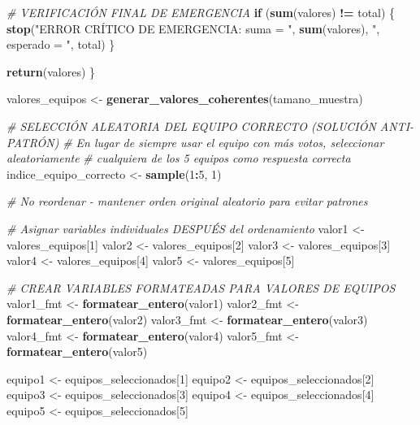 \documentclass[
]{article}
\newenvironment{Shaded}{\begin{snugshade}}{\end{snugshade}}
\newcommand{\CommentTok}[1]{\textcolor[rgb]{0.56,0.35,0.01}{\textit{#1}}}
\newcommand{\ControlFlowTok}[1]{\textcolor[rgb]{0.13,0.29,0.53}{\textbf{#1}}}
\newcommand{\DecValTok}[1]{\textcolor[rgb]{0.00,0.00,0.81}{#1}}
\newcommand{\FunctionTok}[1]{\textcolor[rgb]{0.13,0.29,0.53}{\textbf{#1}}}
\newcommand{\NormalTok}[1]{#1}
\newcommand{\OtherTok}[1]{\textcolor[rgb]{0.56,0.35,0.01}{#1}}
\newcommand{\SpecialCharTok}[1]{\textcolor[rgb]{0.81,0.36,0.00}{\textbf{#1}}}
\newcommand{\StringTok}[1]{\textcolor[rgb]{0.31,0.60,0.02}{#1}}
\begin{document}
\begin{Shaded}
\begin{Highlighting}[]
  \CommentTok{\# VERIFICACIÓN FINAL DE EMERGENCIA}
  \ControlFlowTok{if}\NormalTok{ (}\FunctionTok{sum}\NormalTok{(valores) }\SpecialCharTok{!=}\NormalTok{ total) \{}
    \FunctionTok{stop}\NormalTok{(}\StringTok{"ERROR CRÍTICO DE EMERGENCIA: suma = "}\NormalTok{, }\FunctionTok{sum}\NormalTok{(valores), }\StringTok{", esperado = "}\NormalTok{, total)}
\NormalTok{  \}}

  \FunctionTok{return}\NormalTok{(valores)}
\NormalTok{\}}

\NormalTok{valores\_equipos }\OtherTok{\textless{}{-}} \FunctionTok{generar\_valores\_coherentes}\NormalTok{(tamano\_muestra)}

\CommentTok{\# SELECCIÓN ALEATORIA DEL EQUIPO CORRECTO (SOLUCIÓN ANTI{-}PATRÓN)}
\CommentTok{\# En lugar de siempre usar el equipo con más votos, seleccionar aleatoriamente}
\CommentTok{\# cualquiera de los 5 equipos como respuesta correcta}
\NormalTok{indice\_equipo\_correcto }\OtherTok{\textless{}{-}} \FunctionTok{sample}\NormalTok{(}\DecValTok{1}\SpecialCharTok{:}\DecValTok{5}\NormalTok{, }\DecValTok{1}\NormalTok{)}

\CommentTok{\# No reordenar {-} mantener orden original aleatorio para evitar patrones}

\CommentTok{\# Asignar variables individuales DESPUÉS del ordenamiento}
\NormalTok{valor1 }\OtherTok{\textless{}{-}}\NormalTok{ valores\_equipos[}\DecValTok{1}\NormalTok{]}
\NormalTok{valor2 }\OtherTok{\textless{}{-}}\NormalTok{ valores\_equipos[}\DecValTok{2}\NormalTok{]}
\NormalTok{valor3 }\OtherTok{\textless{}{-}}\NormalTok{ valores\_equipos[}\DecValTok{3}\NormalTok{]}
\NormalTok{valor4 }\OtherTok{\textless{}{-}}\NormalTok{ valores\_equipos[}\DecValTok{4}\NormalTok{]}
\NormalTok{valor5 }\OtherTok{\textless{}{-}}\NormalTok{ valores\_equipos[}\DecValTok{5}\NormalTok{]}

\CommentTok{\# CREAR VARIABLES FORMATEADAS PARA VALORES DE EQUIPOS}
\NormalTok{valor1\_fmt }\OtherTok{\textless{}{-}} \FunctionTok{formatear\_entero}\NormalTok{(valor1)}
\NormalTok{valor2\_fmt }\OtherTok{\textless{}{-}} \FunctionTok{formatear\_entero}\NormalTok{(valor2)}
\NormalTok{valor3\_fmt }\OtherTok{\textless{}{-}} \FunctionTok{formatear\_entero}\NormalTok{(valor3)}
\NormalTok{valor4\_fmt }\OtherTok{\textless{}{-}} \FunctionTok{formatear\_entero}\NormalTok{(valor4)}
\NormalTok{valor5\_fmt }\OtherTok{\textless{}{-}} \FunctionTok{formatear\_entero}\NormalTok{(valor5)}

\NormalTok{equipo1 }\OtherTok{\textless{}{-}}\NormalTok{ equipos\_seleccionados[}\DecValTok{1}\NormalTok{]}
\NormalTok{equipo2 }\OtherTok{\textless{}{-}}\NormalTok{ equipos\_seleccionados[}\DecValTok{2}\NormalTok{]}
\NormalTok{equipo3 }\OtherTok{\textless{}{-}}\NormalTok{ equipos\_seleccionados[}\DecValTok{3}\NormalTok{]}
\NormalTok{equipo4 }\OtherTok{\textless{}{-}}\NormalTok{ equipos\_seleccionados[}\DecValTok{4}\NormalTok{]}
\NormalTok{equipo5 }\OtherTok{\textless{}{-}}\NormalTok{ equipos\_seleccionados[}\DecValTok{5}\NormalTok{]}


\end{Highlighting}
\end{Shaded}
\end{document}
